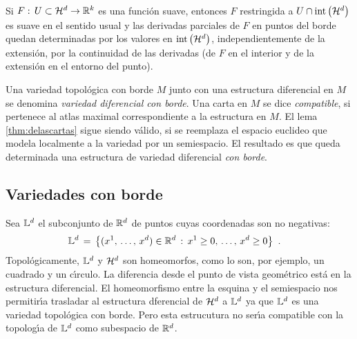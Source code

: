 Si $F:\,U\subset\hemi[d]\rightarrow\bb{R}^{k}$ es una funci\'{o}n suave,
entonces $F$ restringida a $U\cap\interior{\hemi[d]}$ es suave en el
sentido usual y las derivadas parciales de $F$ en puntos del borde quedan
determinadas por los valores en $\interior{\hemi[d]}$, independientemente
de la extensi\'{o}n, por la continuidad de las derivadas (de $F$ en el
interior y de la extensi\'{o}n en el entorno del punto).

Una variedad topol\'{o}gica con borde $M$ junto con una estructura
diferencial en $M$ se denomina \emph{variedad diferencial con borde}.
Una carta en $M$ se dice \emph{compatible}, si pertenece al atlas
maximal correspondiente a la estructura en $M$.
El lema \ref{thm:delascartas} sigue siendo v\'{a}lido, si se reemplaza
el espacio euclideo que modela localmente a la variedad por
un semiespacio. El resultado es que queda determinada una estructura de
variedad diferencial \emph{con borde}.

\subsection{Variedades con borde}
Sea $\esquina{d}$ el subconjunto de $\bb{R}^{d}$ de puntos cuyas coordenadas
son no negativas:
\begin{align*}
	\esquina{d} & \,=\,\left\lbrace(\lista*{x}{d})\in\bb{R}^{d}\,:\,
		x^{1}\geq 0,\,\dots,\,x^{d}\geq 0\right\rbrace
	\text{ .}
\end{align*}
%
Topol\'{o}gicamente, $\esquina{d}$ y $\hemi[d]$ son homeomorfos, como lo
son, por ejemplo, un cuadrado y un c\'{\i}rculo. La diferencia desde el
punto de vista geom\'{e}trico est\'{a} en la estructura diferencial.
El homeomorfismo entre la esquina y el semiespacio nos permitir\'{\i}a
trasladar al estructura dferencial de $\hemi[d]$ a $\esquina{d}$ ya
que $\esquina{d}$ es una variedad topol\'{o}gica con borde. Pero esta
estrucutura no ser\'{\i}a compatible con la topolog\'{\i}a de
$\esquina{d}$ como subespacio de $\bb{R}^{d}$.

